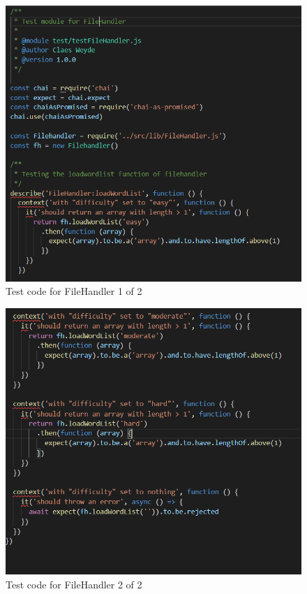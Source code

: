 \documentclass[12pt, letterpaper]{article}
\begin{document}
\begin{figure}[H]\label{fig:code21}
	\includegraphics{code2_1}
	\caption{Test code for FileHandler 1 of 2}
	\centering
\end{figure}
\begin{figure}[H]\label{fig:code22}
	\includegraphics{code2_2}
	\caption{Test code for FileHandler 2 of 2}
	\centering
\end{figure}
\end{document}
